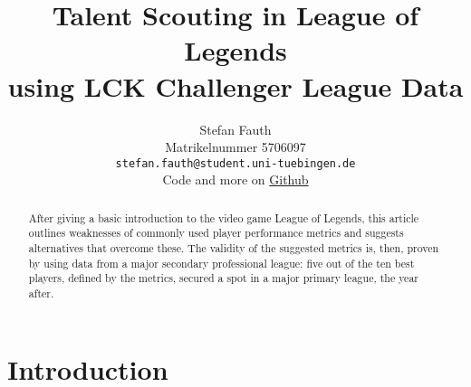 \documentclass{article}
\title{Talent Scouting in League of Legends \\ using LCK Challenger League Data}
\author{%
  Stefan Fauth\\
  Matrikelnummer 5706097\\
  \texttt{stefan.fauth@student.uni-tuebingen.de}\\ Code and more on \href{https://github.com/SFauth}{Github}
}
\begin{document}
\maketitle

\begin{abstract}
After giving a basic introduction to the video game League of Legends, this article outlines weaknesses of commonly used player performance metrics and suggests alternatives that overcome these. The validity of the suggested metrics is, then, proven by using data from a major secondary professional league: five out of the ten best players, defined by the metrics, secured a spot in a major primary league, the year after. 
\end{abstract}

\section{Introduction}
\end{document}
